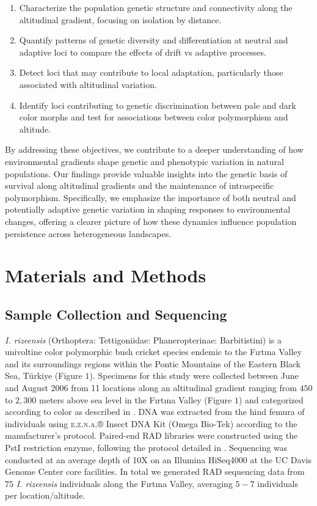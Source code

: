 \documentclass[9pt,a4paper,twoside]{rho-class/rho}
\begin{document}
    \begin{enumerate}
    \item Characterize the population genetic structure and connectivity along the altitudinal gradient, focusing on isolation by distance.
    \item Quantify patterns of genetic diversity and differentiation at neutral and adaptive loci to compare the effects of drift vs adaptive processes.
    \item Detect loci that may contribute to local adaptation, particularly those associated with altitudinal variation.
    \item Identify loci contributing to genetic discrimination between pale and dark color morphs and test for associations between color polymorphism and altitude.
    \end{enumerate}
    
    By addressing these objectives, we contribute to a deeper understanding of how environmental gradients shape genetic and phenotypic variation in natural populations. Our findings provide valuable insights into the genetic basis of survival along altitudinal gradients and the maintenance of intraspecific polymorphism. Specifically, we emphasize the importance of both neutral and potentially adaptive genetic variation in shaping responses to environmental changes, offering a clearer picture of how these dynamics influence population persistence across heterogeneous landscapes.

\section{Materials and Methods}

    \subsection{Sample Collection and Sequencing}

       \textit{I. rizeensis} (Orthoptera: Tettigoniidae: Phaneropterinae: Barbitistini) is a univoltine color polymorphic bush cricket species endemic to the Fırtına Valley and its surroundings regions within the Pontic Mountains of the Eastern Black Sea, Türkiye (Figure $1$). Specimens for this study were collected between June and August 2006 from 11 locations along an altitudinal gradient ranging from $450$ to $2,300$ meters above sea level in the Fırtına Valley (Figure $1$) and categorized according to color as described in \cite{Çağlar2014}. DNA was extracted from the hind femura of individuals using \textsc{e.z.n.a.}® Insect DNA Kit (Omega Bio-Tek) according to the manufacturer’s protocol. Paired-end RAD libraries were constructed using the PstI restriction enzyme, following the protocol detailed in \cite{Ali2016}. Sequencing was conducted at an average depth of 10X on an Illumina HiSeq4000 at the UC Davis Genome Center core facilities. In total we generated RAD sequencing data from $75$ \textit{I. rizeensis} individuals along the Fırtına Valley, averaging $5-7$ individuals per location/altitude.
    
\end{document}
